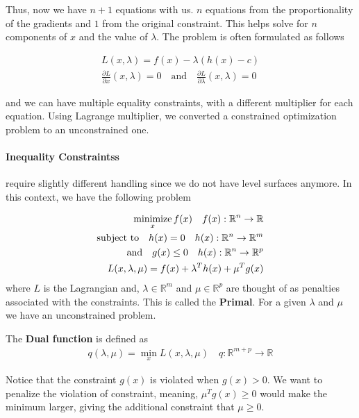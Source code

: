 \documentclass[../../statistical_learning_notes.tex]{subfiles}
\begin{document}
Thus, now we have $n+1$ equations with us. $n$ equations from the proportionality of the gradients and $1$ from the original constraint. This helps solve for $n$ components of $x$ and the value of $\lambda$. The problem is often formulated as follows

\begin{gather*}
    L(x, \lambda) = f(x) - \lambda (h(x) - c)\\
    \frac{\partial L}{\partial x}(x, \lambda) = 0 \quad \text{and}\quad \frac{\partial L}{\partial \lambda}(x, \lambda) = 0
\end{gather*}

and we can have multiple equality constraints, with a different multiplier for each equation. Using Lagrange multiplier, we converted a constrained optimization problem to an unconstrained one.

\paragraph{Inequality Constraintss} require slightly different handling since we do not have level surfaces anymore. In this context, we have the following problem

\begin{align*}
    \operatorname*{minimize}_{x} f(x) \quad f(x):\mathbb{R}^{n} \rightarrow \mathbb{R}\\
    \text{subject to} \quad h(x) = 0 \quad h(x):\mathbb{R}^{n} \rightarrow \mathbb{R}^{m}\\
    \text{and} \quad g(x) \leq 0 \quad h(x):\mathbb{R}^{n} \rightarrow \mathbb{R}^{p}\\
    L(x, \lambda, \mu) = f(x) + \lambda^{T}h(x) + \mu^{T}g(x)
\end{align*}
where $L$ is the Lagrangian and, $\lambda \in \mathbb{R}^{m}$ and $\mu \in \mathbb{R}^{p}$ are thought of as penalties associated with the constraints. This is called the \textbf{Primal}. For a given $\lambda$ and $\mu$ we have an unconstrained problem.\newline

The \textbf{Dual function} is defined as
\begin{align*}
    q(\lambda, \mu) = \min_{x} L(x, \lambda, \mu) \quad q:\mathbb{R}^{m+p} \rightarrow \mathbb{R}
\end{align*}

Notice that the constraint $g(x)$ is violated when $g(x) > 0$. We want to penalize the violation of constraint, meaning, $\mu^{T}g(x) \geq 0$ would make the minimum larger, giving the additional constraint that $\mu \geq 0$.\newline
\end{document}
